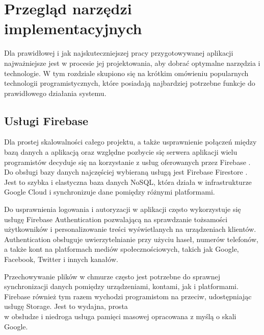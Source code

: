 \section{Przegląd narzędzi implementacyjnych}
Dla prawidłowej i jak najskuteczniejszej pracy przygotowywanej aplikacji najważniejsze jest w procesie jej projektowania, aby dobrać optymalne narzędzia i technologie. W tym rozdziale skupiono się na krótkim omówieniu popularnych technologii programistycznych, które posiadają najbardziej potrzebne funkcje do prawidłowego działania systemu.

\subsection*{Usługi Firebase}
Dla prostej skalowalności całego projektu, a także usprawnienie połączeń między bazą danych a aplikacją oraz względne pozbycie się serwera aplikacji wielu programistów decyduje się na korzystanie z usług oferowanych przez Firebase \cite{firebase}. Do obsługi bazy danych najczęściej wybieraną usługą jest Firebase Firestore \cite{firebase-book}. Jest to szybka i elastyczna baza danych NoSQL, która działa w infrastrukturze Google Cloud i synchronizuje dane pomiędzy różnymi platformami.\par
Do usprawnienia logowania i autoryzacji w aplikacji często wykorzystuje się usługę Firebase Authentication \cite{fireauth} pozwalającą na sprawdzanie tożsamości użytkowników i personalizowanie treści wyświetlanych na urządzeniach klientów. Authentication obsługuje uwierzytelnianie przy użyciu haseł, numerów telefonów, a także kont na platformach mediów społecznościowych, takich jak Google, Facebook, Twitter i innych kanałów.\par
Przechowywanie plików w chmurze często jest potrzebne do sprawnej synchronizacji danych pomiędzy urządzeniami, kontami, jak i platformami. Firebase również tym razem wychodzi programistom na przeciw, udostępniając usługę Storage. Jest to wydajna, prosta \\w obsłudze i niedroga usługa pamięci masowej opracowana z myślą o skali Google.

